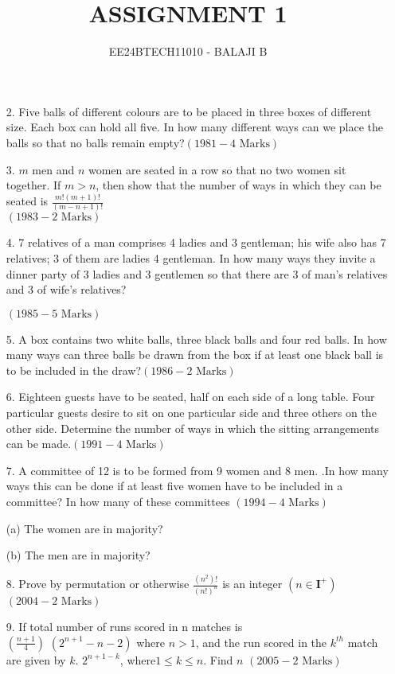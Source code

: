 \documentclass[journal,12pt,twocolumn]{IEEEtran}
\theoremstyle{remark}
\begin{document}

\vspace{3cm}

\title{ASSIGNMENT 1}
\author{EE24BTECH11010 - BALAJI B}
\maketitle
\newpage
\bigskip

\renewcommand{\thefigure}{\theenumi}
\renewcommand{\thetable}{\theenumi}
\begin{enumerate}
    \item[2.]   Five balls of different colours are to be placed in three boxes of different size. Each box can hold all five. In how many different ways can we place the balls so that no balls remain empty?\hfill $(1981- 4 \text{ Marks})$
    \item[3.] $m$ men and $n$ women are seated in a row so that no two women sit together. If $m>n$, then show that the number of ways in which they can be seated is $\frac{m!(m+1)!}{(m-n+1)!}$ \\

    \hfill $(1983-2\text{ Marks})$
    \item[4.] 7 relatives of a man comprises 4 ladies and 3 gentleman; his wife also has 7 relatives; 3 of them are ladies 4 gentleman. In how many ways they invite a dinner party of 3 ladies and 3 gentlemen so that there are 3 of man's relatives and 3 of wife's relatives?
    
    \hfill $(1985- 5 \text{ Marks})$
    \item[5.]A box contains two white balls, three black balls and four red balls. In how many ways can three balls be drawn from the box if at least one black ball is to be included in the draw?\hfill $(1986-2\text{ Marks})$  
    \item[6. ] Eighteen guests have to be seated, half on each side of a long table. Four particular guests desire to sit on one particular side and three others on the other side. Determine the number of ways in which the sitting arrangements can be made.\hfill $(1991-4\text{ Marks})$
    \item[7.]A committee of 12 is to be formed from 9 women and 8 men. .In how many ways this can be done if at least five women have to be included in a committee? In how many of these committees \hfill $(1994- 4 \text{ Marks})$

    (a)  The women are in majority?
    
    (b)  The men are in majority?
    
    \item[8. ] Prove by permutation or otherwise $\frac{(n^2)!}{(n!)^n}$ is an integer $(n\in \mathbf{I}^+) $\hfill $(2004-2\text{ Marks})$  
     \item[9. ] If total number of runs scored in n matches is\\
     
     $\left(\frac{n+1}{4}\right)$ $(2^{n+1}-n-2)$ where $n>1$, and the run scored in the $k^{th}$ match are given by $k$. $2^{n+1-k}$, where$ 1 \leq k \leq n$. Find $n$ \hfill $(2005- 2 \text{ Marks})$
     
    \end{enumerate}
\end{document}

